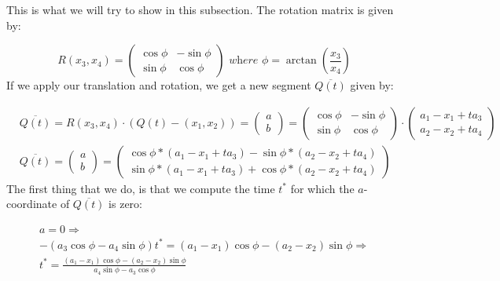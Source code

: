 \documentclass{article}
\begin{document}
This is what we will try to show in this subsection. The rotation matrix is given by:

\begin{equation}
    R(x_3,x_4) = \left( \begin{array}{cc}
         \cos \phi & -\sin \phi  \\
         \sin \phi & \cos \phi 
    \end{array} \right) \textit{ where } \phi = \arctan ( \frac{x_3}{x_4})
\end{equation}
If we apply our translation and rotation, we get a new segment $\overline{Q(t)}$ given by:

\begin{align*}
    &\overline{Q(t)} = R(x_3, x_4) \cdot (Q(t) - (x_1, x_2)) =  
    \left( \begin{array}{c}
         a  \\
         b 
    \end{array} \right) =  \left( \begin{array}{cc}
         \cos \phi & -\sin \phi  \\
         \sin \phi & \cos \phi 
    \end{array} \right)  \cdot \left( \begin{array}{c}
         a_1 - x_1 + t a_3  \\
         a_2 - x_2 + t a_4 
    \end{array} \right) \\
    &\overline{Q(t)} = 
    \left(
    \begin{array}{c}
         a  \\
         b 
    \end{array}  \right) = 
    \left( \begin{array}{c}
         \cos \phi * (a_1 - x_1 + t a_3) - \sin \phi * ( a_2 - x_2 + t a_4 )  \\
         \sin \phi * (a_1 - x_1 + t a_3) + \cos \phi  * (a_2 - x_2 + t a_4) 
    \end{array} \right)
\end{align*}
The first thing that we do, is that we compute the time $t^*$ for which the $a$-coordinate of $\overline{Q(t)}$ is zero:

\begin{align*}
    a = 0 \Rightarrow \\
    - (a_3 \cos \phi  - a_4 \sin \phi)t^* = (a_1 - x_1)\cos \phi  - (a_2 - x_2)\sin \phi \Rightarrow \\
    t^* = \frac{ (a_1 - x_1)\cos \phi  - (a_2 - x_2)\sin \phi}{ a_4 \sin \phi -a_3 \cos \phi}
\end{align*}
\end{document}
